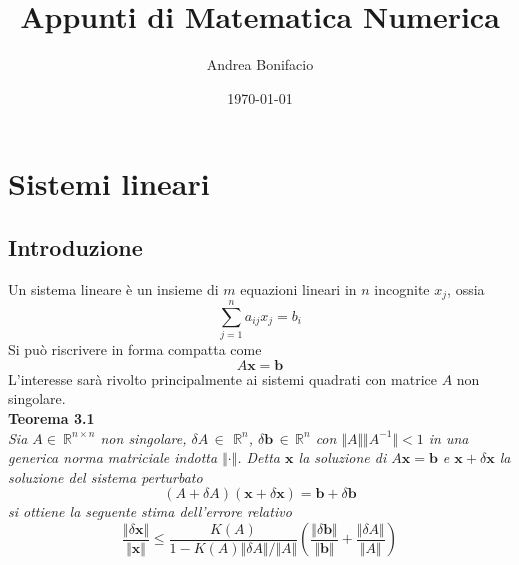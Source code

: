 \documentclass[a4paper,12pt]{article}
\begin{document}
\title{Appunti di Matematica Numerica}
\author{Andrea Bonifacio}
\date{\today}
\maketitle


\section{Sistemi lineari}
\subsection{Introduzione}
Un sistema lineare è un insieme di $m$ equazioni lineari in $n$ incognite \textbf{$x_j$}, ossia 
$$ \sum_{j = 1}^n a_{ij}x_{j}=b_{i} $$
Si può riscrivere in forma compatta come 
$$ A\textbf{x} = \textbf{b}$$
L'interesse sarà rivolto principalmente ai sistemi quadrati con matrice $A$ non singolare. \\
\textbf{Teorema 3.1} \\
\textit{Sia $A \in  \ \mathbb{R}^{n\times n}$ non singolare, $\delta A \, \in \, \ \mathbb{R}^{n}$, $\delta \textbf{b}\, \in  \, \mathbb{R}^{n}$ con $\Vert A \Vert \Vert A^{-1}\Vert < 1 $ in una generica norma matriciale indotta $\Vert \cdot \Vert$. Detta $\textbf{x}$ la soluzione di $A\textbf{x} = \textbf{b}$ e $\textbf{x} + \delta\textbf{x}$ la soluzione del sistema perturbato 
$$(A + \delta A) (\textbf{x} + \delta\textbf{x}) = \textbf{b} + \delta\textbf{b} $$
si ottiene la seguente stima dell'errore relativo
$$
\frac{\Vert \delta\textbf{x} \Vert}{\Vert \textbf{x}\Vert} \leq \frac{K(A)}{1-K(A)\Vert \delta A \Vert / \Vert A\Vert} \left(\frac{\Vert \delta \textbf{b}\Vert}{\Vert \textbf{b}\Vert} + \frac{\Vert \delta A \Vert}{\Vert A \Vert} \right)
$$
} \\
\end{document}
